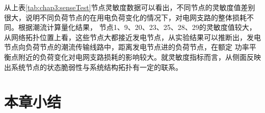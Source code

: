 从上表\ref{tab:chap3:senseTest}节点灵敏度数据可以看出，不同节点的灵敏度值差别很大，说明不同负荷节点的在用电负荷变化的情况下，对电网支路的整体损耗不同。根据潮流计算量化结果，
节点1、9、20、23、25、28、29的灵敏度值较大，从网络拓扑位置上看，这些节点大都接近发电节点，从实验结果可以推断出，发电节点向负荷节点的潮流传输线路中，距离发电节点进的负荷节点，在额定
功率平衡点附近的负荷变化对电网支路损耗的影响较大。就灵敏度指标而言，从侧面反映出系统节点的状态脆弱性与系统结构拓扑有一定的联系。




\section{本章小结}
\label{sec:sum3}





